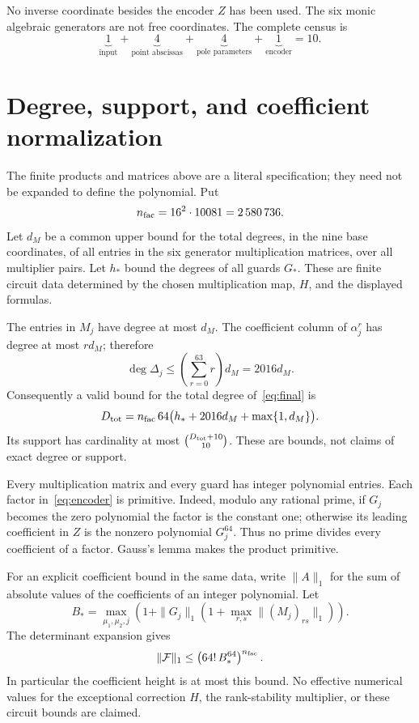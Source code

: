 \documentclass[11pt,a4paper]{article}
\begin{document}
No inverse coordinate besides the encoder \(Z\) has been used.
The six monic algebraic generators are not free coordinates. The
complete census is
\[
 \underbrace{1}_{\text{input}}+
 \underbrace{4}_{\text{point abscissas}}+
 \underbrace{4}_{\text{pole parameters}}+
 \underbrace{1}_{\text{encoder}}=10.
\]

\section{Degree, support, and coefficient normalization}\label{sec:bounds}

The finite products and matrices above are a literal specification;
they need not be expanded to define the polynomial. Put
\[
 n_{\rm fac}=16^2\cdot10081=2\,580\,736.
\]
Let \(d_M\) be a common upper bound for the total degrees, in the nine
base coordinates, of all entries in the six generator multiplication
matrices, over all multiplier pairs. Let \(h_*\) bound the degrees
of all guards \(G_*\). These are finite circuit data determined by
the chosen multiplication map, \(H\), and the displayed formulas.

The entries in \(M_j\) have degree at most \(d_M\).
The coefficient column of \(\alpha_j^r\) has degree at most \(rd_M\);
therefore
\[
 \deg\Delta_j\le\left(\sum_{r=0}^{63}r\right)d_M=2016d_M.
\]
Consequently a valid bound for the total degree of~\eqref{eq:final} is
\begin{equation}\label{eq:degree}
 D_{\rm tot}
 =n_{\rm fac}\,64\bigl(h_*+2016d_M+\max\{1,d_M\}\bigr).
\end{equation}
Its support has cardinality at most \(\binom{D_{\rm tot}+10}{10}\).
These are bounds, not claims of exact degree or support.

Every multiplication matrix and every guard has integer polynomial
entries. Each factor in~\eqref{eq:encoder} is primitive. Indeed, modulo
any rational prime, if \(G_j\) becomes the zero polynomial the factor
is the constant one; otherwise its leading coefficient in \(Z\) is
the nonzero polynomial \(G_j^{64}\). Thus no prime divides every
coefficient of a factor. Gauss's lemma makes the product primitive.

For an explicit coefficient bound in the same data, write
\(\|A\|_1\) for the sum of absolute values of the coefficients of an
integer polynomial. Let
\[
 B_*=\max_{\mu_1,\mu_2,j}
 \left(1+\|G_j\|_1
       \left(1+\max_{r,s}\|(M_j)_{rs}\|_1\right)\right).
\]
The determinant expansion gives
\[
 \|\mathcal F\|_1
 \le \left(64!\,B_*^{64}\right)^{n_{\rm fac}}.
\]
In particular the coefficient height is at most this bound.
No effective numerical values for the exceptional correction \(H\),
the rank-stability multiplier, or these circuit bounds are claimed.
\end{document}
